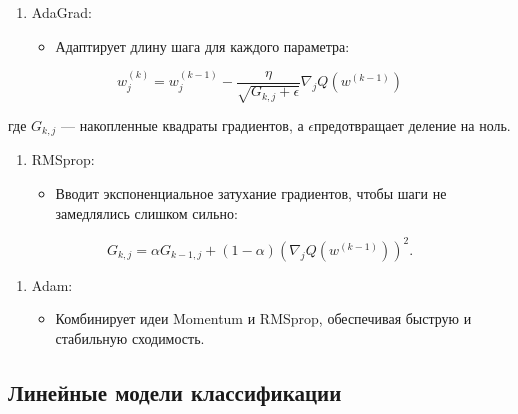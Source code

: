 \begin{enumerate}
\def\labelenumi{\arabic{enumi}.}
\setcounter{enumi}{1}
\tightlist
\item
  AdaGrad:

  \begin{itemize}
  \tightlist
  \item
    Адаптирует длину шага для каждого параметра:
  \end{itemize}
\end{enumerate}

\begin{equation}
w_j^{(k)} = w_j^{(k-1)} - \frac{\eta}{\sqrt{G_{k,j} + \epsilon}} \nabla_j Q(w^{(k-1)})
\end{equation}

где \(G_{k,j}\) --- накопленные квадраты градиентов, а
\(\epsilon\)предотвращает деление на ноль.

\begin{enumerate}
\def\labelenumi{\arabic{enumi}.}
\setcounter{enumi}{2}
\tightlist
\item
  RMSprop:

  \begin{itemize}
  \tightlist
  \item
    Вводит экспоненциальное затухание градиентов, чтобы шаги не
    замедлялись слишком сильно:
  \end{itemize}
\end{enumerate}

\begin{equation}
G_{k,j} = \alpha G_{k-1,j} + (1 - \alpha)(\nabla_j Q(w^{(k-1)}))^2.
\end{equation}

\begin{enumerate}
\def\labelenumi{\arabic{enumi}.}
\setcounter{enumi}{3}
\tightlist
\item
  Adam:

  \begin{itemize}
  \tightlist
  \item
    Комбинирует идеи Momentum и RMSprop, обеспечивая быструю и
    стабильную сходимость.
  \end{itemize}
\end{enumerate}

\hypertarget{ux43bux438ux43dux435ux439ux43dux44bux435-ux43cux43eux434ux435ux43bux438-ux43aux43bux430ux441ux441ux438ux444ux438ux43aux430ux446ux438ux438}{%
\subsection*{Линейные модели
классификации}\label{ux43bux438ux43dux435ux439ux43dux44bux435-ux43cux43eux434ux435ux43bux438-ux43aux43bux430ux441ux441ux438ux444ux438ux43aux430ux446ux438ux438}}

